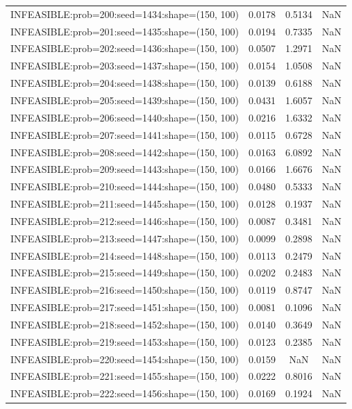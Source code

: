 \begin{longtable}{lccc}
INFEASIBLE:prob=200:seed=1434:shape=(150, 100) & 0.0178 &  0.5134 &    NaN \\
INFEASIBLE:prob=201:seed=1435:shape=(150, 100) & 0.0194 &  0.7335 &    NaN \\
INFEASIBLE:prob=202:seed=1436:shape=(150, 100) & 0.0507 &  1.2971 &    NaN \\
INFEASIBLE:prob=203:seed=1437:shape=(150, 100) & 0.0154 &  1.0508 &    NaN \\
INFEASIBLE:prob=204:seed=1438:shape=(150, 100) & 0.0139 &  0.6188 &    NaN \\
INFEASIBLE:prob=205:seed=1439:shape=(150, 100) & 0.0431 &  1.6057 &    NaN \\
INFEASIBLE:prob=206:seed=1440:shape=(150, 100) & 0.0216 &  1.6332 &    NaN \\
INFEASIBLE:prob=207:seed=1441:shape=(150, 100) & 0.0115 &  0.6728 &    NaN \\
INFEASIBLE:prob=208:seed=1442:shape=(150, 100) & 0.0163 &  6.0892 &    NaN \\
INFEASIBLE:prob=209:seed=1443:shape=(150, 100) & 0.0166 &  1.6676 &    NaN \\
INFEASIBLE:prob=210:seed=1444:shape=(150, 100) & 0.0480 &  0.5333 &    NaN \\
INFEASIBLE:prob=211:seed=1445:shape=(150, 100) & 0.0128 &  0.1937 &    NaN \\
INFEASIBLE:prob=212:seed=1446:shape=(150, 100) & 0.0087 &  0.3481 &    NaN \\
INFEASIBLE:prob=213:seed=1447:shape=(150, 100) & 0.0099 &  0.2898 &    NaN \\
INFEASIBLE:prob=214:seed=1448:shape=(150, 100) & 0.0113 &  0.2479 &    NaN \\
INFEASIBLE:prob=215:seed=1449:shape=(150, 100) & 0.0202 &  0.2483 &    NaN \\
INFEASIBLE:prob=216:seed=1450:shape=(150, 100) & 0.0119 &  0.8747 &    NaN \\
INFEASIBLE:prob=217:seed=1451:shape=(150, 100) & 0.0081 &  0.1096 &    NaN \\
INFEASIBLE:prob=218:seed=1452:shape=(150, 100) & 0.0140 &  0.3649 &    NaN \\
INFEASIBLE:prob=219:seed=1453:shape=(150, 100) & 0.0123 &  0.2385 &    NaN \\
INFEASIBLE:prob=220:seed=1454:shape=(150, 100) & 0.0159 &     NaN &    NaN \\
INFEASIBLE:prob=221:seed=1455:shape=(150, 100) & 0.0222 &  0.8016 &    NaN \\
INFEASIBLE:prob=222:seed=1456:shape=(150, 100) & 0.0169 &  0.1924 &    NaN \\

\end{longtable}
